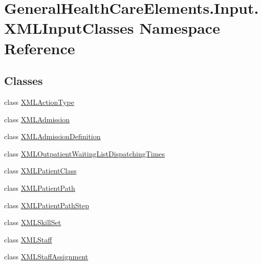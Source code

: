 \hypertarget{namespace_general_health_care_elements_1_1_input_1_1_x_m_l_input_classes}{}\section{General\+Health\+Care\+Elements.\+Input.\+X\+M\+L\+Input\+Classes Namespace Reference}
\label{namespace_general_health_care_elements_1_1_input_1_1_x_m_l_input_classes}
\subsection*{Classes}
\begin{DoxyCompactItemize}
\item 
class \hyperlink{class_general_health_care_elements_1_1_input_1_1_x_m_l_input_classes_1_1_x_m_l_action_type}{X\+M\+L\+Action\+Type}
\item 
class \hyperlink{class_general_health_care_elements_1_1_input_1_1_x_m_l_input_classes_1_1_x_m_l_admission}{X\+M\+L\+Admission}
\item 
class \hyperlink{class_general_health_care_elements_1_1_input_1_1_x_m_l_input_classes_1_1_x_m_l_admission_definition}{X\+M\+L\+Admission\+Definition}
\item 
class \hyperlink{class_general_health_care_elements_1_1_input_1_1_x_m_l_input_classes_1_1_x_m_l_outpatient_waiting_list_dispatching_times}{X\+M\+L\+Outpatient\+Waiting\+List\+Dispatching\+Times}
\item 
class \hyperlink{class_general_health_care_elements_1_1_input_1_1_x_m_l_input_classes_1_1_x_m_l_patient_class}{X\+M\+L\+Patient\+Class}
\item 
class \hyperlink{class_general_health_care_elements_1_1_input_1_1_x_m_l_input_classes_1_1_x_m_l_patient_path}{X\+M\+L\+Patient\+Path}
\item 
class \hyperlink{class_general_health_care_elements_1_1_input_1_1_x_m_l_input_classes_1_1_x_m_l_patient_path_step}{X\+M\+L\+Patient\+Path\+Step}
\item 
class \hyperlink{class_general_health_care_elements_1_1_input_1_1_x_m_l_input_classes_1_1_x_m_l_skill_set}{X\+M\+L\+Skill\+Set}
\item 
class \hyperlink{class_general_health_care_elements_1_1_input_1_1_x_m_l_input_classes_1_1_x_m_l_staff}{X\+M\+L\+Staff}
\item 
class \hyperlink{class_general_health_care_elements_1_1_input_1_1_x_m_l_input_classes_1_1_x_m_l_staff_assignment}{X\+M\+L\+Staff\+Assignment}

\end{DoxyCompactItemize}
